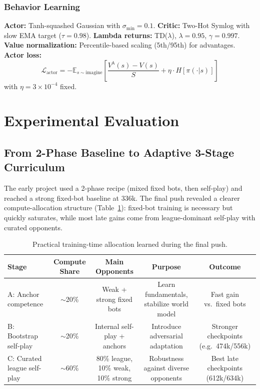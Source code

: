 \documentclass[11pt]{article}
\begin{document}
\subsubsection{Behavior Learning}

\textbf{Actor:} Tanh-squashed Gaussian with $\sigma_{\min} = 0.1$. \textbf{Critic:} Two-Hot Symlog with slow EMA target ($\tau = 0.98$). \textbf{Lambda returns:} TD($\lambda$), $\lambda = 0.95$, $\gamma = 0.997$. \textbf{Value normalization:} Percentile-based scaling (5th/95th) for advantages. \textbf{Actor loss:}
\begin{equation}
\mathcal{L}_\text{actor} = -\mathbb{E}_{s \sim \text{imagine}} \left[ \frac{V^\lambda(s) - V(s)}{S} + \eta \cdot H[\pi(\cdot|s)] \right]
\end{equation}
with $\eta = 3 \times 10^{-4}$ fixed.

\section{Experimental Evaluation}\label{sec:experiments}

\subsection{From 2-Phase Baseline to Adaptive 3-Stage Curriculum}

The early project used a 2-phase recipe (mixed fixed bots, then self-play) and reached a strong fixed-bot baseline at 336k. The final push revealed a clearer compute-allocation structure (Table~\ref{tab:training-phases}): fixed-bot training is necessary but quickly saturates, while most late gains come from league-dominant self-play with curated opponents.

\begin{table}[h]
\centering
\small
\begin{tabular}{lcccc}
\toprule
\textbf{Stage} & \textbf{Compute Share} & \textbf{Main Opponents} & \textbf{Purpose} & \textbf{Outcome} \\
\midrule
A: Anchor competence & $\sim$20\% & Weak + strong fixed bots & Learn fundamentals, stabilize world model & Fast gain vs.\ fixed bots \\
B: Bootstrap self-play & $\sim$20\% & Internal self-play + anchors & Introduce adversarial adaptation & Stronger checkpoints (e.g.\ 474k/556k) \\
C: Curated league self-play & $\sim$60\% & 80\% league, 10\% weak, 10\% strong & Robustness against diverse opponents & Best late checkpoints (612k/634k) \\
\bottomrule
\end{tabular}
\caption{Practical training-time allocation learned during the final push.}
\label{tab:training-phases}
\end{table}
\end{document}
